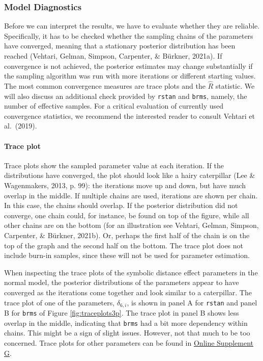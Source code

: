 \documentclass[
  english,
  doc,floatsintext]{apa6}
\let\oldparagraph\paragraph
\renewcommand{\paragraph}[1]{\oldparagraph{#1}\mbox{}}
\begin{document}
\hypertarget{model-diagnostics}{%
\subsubsection{Model Diagnostics}\label{model-diagnostics}}

Before we can interpret the results, we have to evaluate whether they are reliable. Specifically, it has to be checked whether the sampling chains of the parameters have converged, meaning that a stationary posterior distribution has been reached (Vehtari, Gelman, Simpson, Carpenter, \& Bürkner, 2021a). If convergence is not achieved, the posterior estimates may change substantially if the sampling algorithm was run with more iterations or different starting values. The most common convergence measures are trace plots and the \(\hat{R}\) statistic. We will also discuss an additional check provided by \texttt{rstan} and \texttt{brms}, namely, the number of effective samples. For a critical evaluation of currently used convergence statistics, we recommend the interested reader to consult Vehtari et al.~(2019).

\hypertarget{trace-plot}{%
\paragraph{Trace plot}\label{trace-plot}}

Trace plots show the sampled parameter value at each iteration. If the distributions have converged, the plot should look like a hairy caterpillar (Lee \& Wagenmakers, 2013, p. 99): the iterations move up and down, but have much overlap in the middle. If multiple chains are used, iterations are shown per chain. In this case, the chains should overlap. If the posterior distribution did not converge, one chain could, for instance, be found on top of the figure, while all other chains are on the bottom (for an illustration see Vehtari, Gelman, Simpson, Carpenter, \& Bürkner, 2021b). Or, perhaps the first half of the chain is on the top of the graph and the second half on the bottom. The trace plot does not include burn-in samples, since these will not be used for parameter estimation.

When inspecting the trace plots of the symbolic distance effect parameters in the normal model, the posterior distributions of the parameters appear to have converged as the iterations come together and look similar to a caterpillar. The trace plot of one of the parameters, \(\delta_{6, i}\), is shown in panel A for \texttt{rstan} and panel B for \texttt{brms} of Figure \ref{fig:traceplots3p}. The trace plot in panel B shows less overlap in the middle, indicating that \texttt{brms} had a bit more dependency within chains. This might be a sign of slight issues. However, not that much to be too concerned. Trace plots for other parameters can be found in
\href{https://github.com/MyrtheV/Bayesian-Hierarchical-Modelling-An-Introduction-and-Reassessment/tree/main/G\%20-\%20Trace\%20Plots\%20}{Online Supplement G}.
\end{document}
